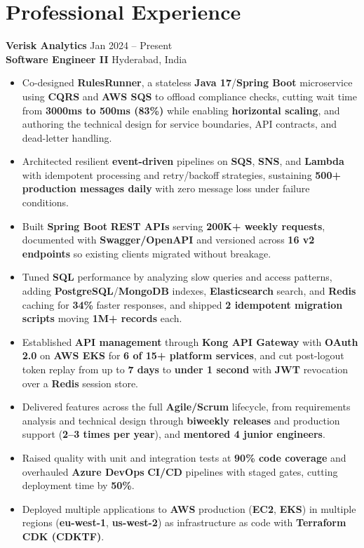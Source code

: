 \documentclass[a4paper,10pt]{article}
\begin{document}
\section*{Professional Experience}

\textbf{Verisk Analytics} \hfill Jan 2024 -- Present \\
\textbf{Software Engineer II} \hfill Hyderabad, India

\begin{itemize}[leftmargin=*]
    \item Co-designed \textbf{RulesRunner}, a stateless \textbf{Java 17}/\textbf{Spring Boot} microservice using \textbf{CQRS} and \textbf{AWS SQS} to offload compliance checks, cutting wait time from \textbf{3000ms to 500ms (83\%)} while enabling \textbf{horizontal scaling}, and authoring the technical design for service boundaries, API contracts, and dead-letter handling.
    \item Architected resilient \textbf{event-driven} pipelines on \textbf{SQS}, \textbf{SNS}, and \textbf{Lambda} with idempotent processing and retry/backoff strategies, sustaining \textbf{500+ production messages daily} with zero message loss under failure conditions.
    \item Built \textbf{Spring Boot} \textbf{REST APIs} serving \textbf{200K+ weekly requests}, documented with \textbf{Swagger/OpenAPI} and versioned across \textbf{16 v2 endpoints} so existing clients migrated without breakage.
    \item Tuned \textbf{SQL} performance by analyzing slow queries and access patterns, adding \textbf{PostgreSQL}/\textbf{MongoDB} indexes, \textbf{Elasticsearch} search, and \textbf{Redis} caching for \textbf{34\%} faster responses, and shipped \textbf{2 idempotent migration scripts} moving \textbf{1M+ records} each.
    \item Established \textbf{API management} through \textbf{Kong API Gateway} with \textbf{OAuth 2.0} on \textbf{AWS EKS} for \textbf{6 of 15+ platform services}, and cut post-logout token replay from up to \textbf{7 days} to \textbf{under 1 second} with \textbf{JWT} revocation over a \textbf{Redis} session store.
    \item Delivered features across the full \textbf{Agile/Scrum} lifecycle, from requirements analysis and technical design through \textbf{biweekly releases} and production support (\textbf{2--3 times per year}), and \textbf{mentored 4 junior engineers}.
    \item Raised quality with unit and integration tests at \textbf{90\% code coverage} and overhauled \textbf{Azure DevOps} \textbf{CI/CD} pipelines with staged gates, cutting deployment time by \textbf{50\%}.
    \item Deployed multiple applications to \textbf{AWS} production (\textbf{EC2}, \textbf{EKS}) in multiple regions (\textbf{eu-west-1}, \textbf{us-west-2}) as infrastructure as code with \textbf{Terraform CDK (CDKTF)}.
\end{itemize}
\end{document}
